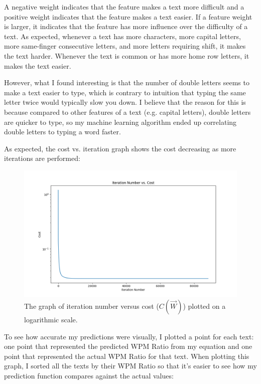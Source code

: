 \documentclass[12pt]{article}
\begin{document}
A negative weight indicates that the feature makes a text more difficult and a positive weight indicates that the feature makes a text easier. If a feature weight is larger, it indicates that the feature has more influence over the difficulty of a text. As expected, whenever a text has more characters, more capital letters, more same-finger consecutive letters, and more letters requiring shift, it makes the text harder. Whenever the text is common or has more home row letters, it makes the text easier.

However, what I found interesting is that the number of double letters seems to make a text easier to type, which is contrary to intuition that typing the same letter twice would typically slow you down. I believe that the reason for this is because compared to other features of a text (e.g. capital letters), double letters are quicker to type, so my machine learning algorithm ended up correlating double letters to typing a word faster.

As expected, the cost vs. iteration graph shows the cost decreasing as more iterations are performed:
\begin{figure}[H]
	\caption{The graph of iteration number versus cost ($C(\vec{W})$) plotted on a logarithmic scale.}
	\includegraphics[width=1\textwidth]{cost.png}
\end{figure}

To see how accurate my predictions were visually, I plotted a point for each text: one point that represented the predicted WPM Ratio from my equation and one point that represented the actual WPM Ratio for that text. When plotting this graph, I sorted all the texts by their WPM Ratio so that it's easier to see how my prediction function compares against the actual values:
\end{document}
